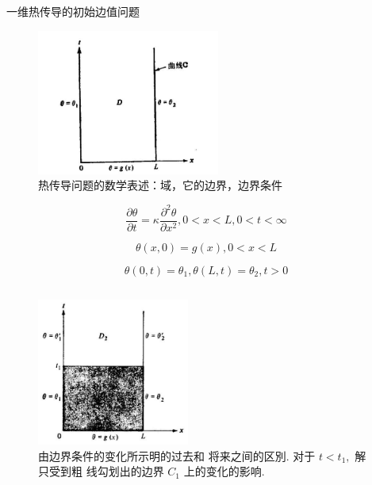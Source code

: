 \documentclass[10pt]{beamer}
\begin{document}
\begin{frame}[allowframebreaks]{一维热传导的初始边值问题}

\begin{figure}[htp]
  \centering
  \includegraphics[width=6cm]{1.2.jpeg}
  \caption{热传导问题的数学表述：域，它的边界，边界条件}
  \label{fig:1.2}
\end{figure}

\begin{equation}
\frac{\partial \theta}{\partial t}=\kappa \frac{\partial^{2} \theta}{\partial x^{2}}, 0<x<L, 0<t<\infty
\end{equation}

\begin{equation}
\theta(x, 0)=g(x), 0<x<L
\end{equation}

\begin{equation}
\theta(0, t)=\theta_{1}, \theta(L, t)=\theta_{2}, t>0
\end{equation}

\begin{columns}

  \begin{figure}[htp]
    \centering
    \includegraphics[width=5cm]{1.3.jpeg}
    \caption{由边界条件的变化所示明的过去和
    将来之间的区別. 对于 $t<t_{1},$ 解只受到粗
    线勾划出的边界 $C_{1}$ 上的变化的影响.}
    \label{fig:1.3}
  \end{figure}
  


\end{columns}
\end{frame}
\end{document}
